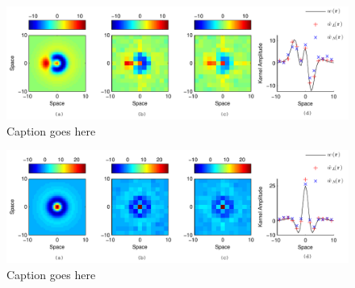 \documentclass[10pt,twocolumn,twoside]{IEEEtran}
\begin{document}
\begin{figure}[ht]
	\centering
		\includegraphics[scale=1]{./Graph/AnisoKernelIEEE.pdf}
	\caption{Caption goes here}
	\label{fig:label}
\end{figure}

\begin{figure}[ht]
	\centering
		\includegraphics[scale=1]{./Graph/IsoKernelIEEE.pdf}
	\caption{Caption goes here}
	\label{fig:label}
\end{figure}  
\end{document}
